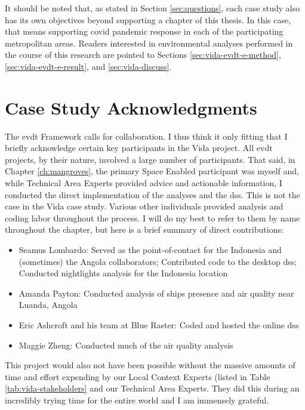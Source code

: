 It should be noted that, as stated in Section \ref{sec:questions}, each case study also has its own objectives beyond supporting a chapter of this thesis. In this case, that means supporting \ac{covid} pandemic response in each of the participating metropolitan areas. Readers interested in environmental analyses performed in the course of this research are pointed to Sections \ref{sec:vida-evdt-e-method}, \ref{sec:vida-evdt-e-result}, and \ref{sec:vida-discuss}.

\section{Case Study Acknowledgments}

The \ac{evdt} Framework calls for collaboration. I thus think it only fitting that I briefly acknowledge certain key participants in the Vida project. All \ac{evdt} projects, by their nature, involved a large number of participants. That said, in Chapter \ref{ch:mangroves}, the primary Space Enabled participant was myself and, while Technical Area Experts provided advice and actionable information, I conducted the direct implementation of the analyses and the \ac{dss}. This is not the case in the Vida case study. Various other individuals provided analysis and coding labor throughout the process. I will do my best to refer to them by name throughout the chapter, but here is a brief summary of direct contributions:

\begin{itemize}[itemsep=0pt,parsep=0pt]
	\item{Seamus Lombardo: Served as the point-of-contact for the Indonesia and (sometimes) the Angola collaborators; Contributed code to the desktop \ac{dss}; Conducted nightlights analysis for the Indonesia location}
	\item{Amanda Payton: Conducted analysis of ships presence and air quality near Luanda, Angola}
	\item{Eric Ashcroft and his team at Blue Raster: Coded and hosted the online \ac{dss}}
	\item{Maggie Zheng: Conducted much of the air quality analysis}
\end{itemize}

This project would also not have been possible without the massive amounts of time and effort expending by our Local Context Experts (listed in Table \ref{tab:vida-stakeholders} and our Technical Area Experts. They did this during an incredibly trying time for the entire world and I am immensely grateful.


